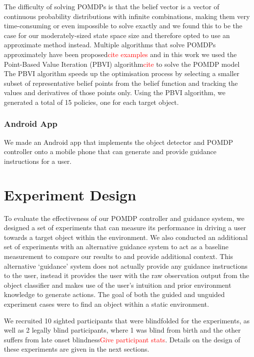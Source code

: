 \documentclass[runningheads]{llncs}
\newcommand\todo[1]{\textcolor{red}{#1}}
\begin{document}
The difficulty of solving POMDPs is that the belief vector is a vector of continuous probability distributions with infinite combinations, making them very time-consuming or even impossible to solve exactly and we found this to be the case for our moderately-sized state space size and therefore opted to use an approximate method instead.
Multiple algorithms that solve POMDPs approximately have been proposed\todo{cite examples} and in this work we used the Point-Based Value Iteration (PBVI) algorithm\todo{cite} to solve the POMDP model 
The PBVI algorithm speeds up the optimisation process by selecting a smaller subset of representative belief points from the belief function and tracking the values and derivatives of those points only. 
Using the PBVI algorithm, we generated a total of 15 policies, one for each target object. 

\subsubsection{Android App}

We made an Android app that implements the object detector and POMDP controller onto a mobile phone that can generate and provide guidance instructions for a user.  

\section{Experiment Design}

To evaluate the effectiveness of our POMDP controller and guidance system, we designed a set of experiments that can measure its performance in driving a user towards a target object within the environment. 
We also conducted an additional set of experiments with an alternative guidance system to act as a baseline measurement to compare our results to and provide additional context. 
This alternative `guidance' system does not actually provide any guidance instructions to the user, instead it provides the user with the raw observation output from the object classifier and makes use of the user's intuition and prior environment knowledge to generate actions. 
The goal of both the guided and unguided experiment cases were to find an object within a static environment. 

We recruited 10 sighted participants that were blindfolded for the experiments, as well as 2 legally blind participants, where 1 was blind from birth and the other suffers from late onset blindness\todo{Give participant stats}.
Details on the design of these experiments are given in the next sections. 
\end{document}

